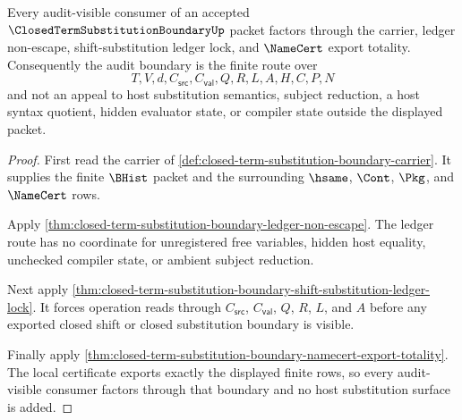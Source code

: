 \begin{theorem}
\label{thm:closed-term-substitution-boundary-audit-boundary-factorization}
Every audit-visible consumer of an accepted $\ClosedTermSubstitutionBoundaryUp$ packet factors through the carrier, ledger non-escape, shift-substitution ledger lock, and $\NameCert$ export totality. Consequently the audit boundary is the finite route over
$$
T,V,d,C_{\mathsf{src}},C_{\mathsf{val}},Q,R,L,A,H,C,P,N
$$
and not an appeal to host substitution semantics, subject reduction, a host syntax quotient, hidden evaluator state, or compiler state outside the displayed packet.
\end{theorem}
\begin{proof}
First read the carrier of \autoref{def:closed-term-substitution-boundary-carrier}. It supplies the finite $\BHist$ packet and the surrounding $\hsame$, $\Cont$, $\Pkg$, and $\NameCert$ rows.

Apply \autoref{thm:closed-term-substitution-boundary-ledger-non-escape}. The ledger route has no coordinate for unregistered free variables, hidden host equality, unchecked compiler state, or ambient subject reduction.

Next apply \autoref{thm:closed-term-substitution-boundary-shift-substitution-ledger-lock}. It forces operation reads through $C_{\mathsf{src}}$, $C_{\mathsf{val}}$, $Q$, $R$, $L$, and $A$ before any exported closed shift or closed substitution boundary is visible.

Finally apply \autoref{thm:closed-term-substitution-boundary-namecert-export-totality}. The local certificate exports exactly the displayed finite rows, so every audit-visible consumer factors through that boundary and no host substitution surface is added.
\end{proof}

